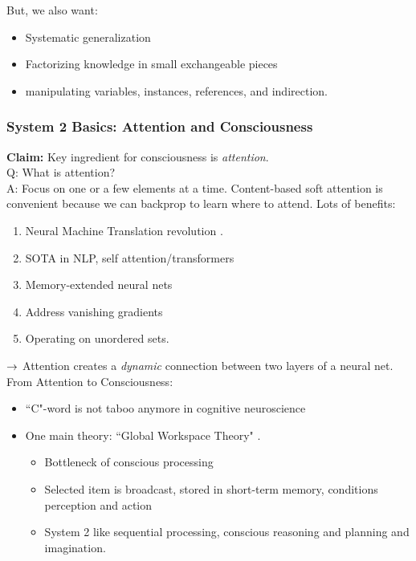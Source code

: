 But, we also want:
\begin{itemize}
    \item Systematic generalization
    \item Factorizing knowledge in small exchangeable pieces
    \item manipulating variables, instances, references, and indirection.
\end{itemize}


\spacerule
\subsubsection{System 2 Basics: Attention and Consciousness}

{\bf Claim:} Key ingredient for consciousness is {\it attention}. \\

Q: What is attention? \\

A: Focus on one or a few elements at a time. Content-based soft attention is convenient because we can backprop to learn where to attend. Lots of benefits:
\begin{enumerate}
    \item Neural Machine Translation revolution \cite{bahdanau2014neural}.
    \item SOTA in NLP, self attention/transformers
    \item Memory-extended neural nets
    \item Address vanishing gradients
    \item Operating on unordered sets.
\end{enumerate}

$\rightarrow$ Attention creates a {\it dynamic} connection between two layers of a neural net. \\

From Attention to Consciousness:
\begin{itemize}
    \item ``C"-word is not taboo anymore in cognitive neuroscience
    \item One main theory: ``Global Workspace Theory" \cite{baars2005global}.
    \begin{itemize}
        \item Bottleneck of conscious processing
        \item Selected item is broadcast, stored in short-term memory, conditions perception and action
        \item System 2 like sequential processing, conscious reasoning and planning and imagination.
    \end{itemize}
\end{itemize}

